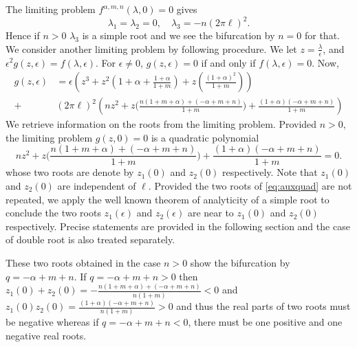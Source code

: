 \documentclass[a4paper,11pt]{article}
\def\l{(2\pi \ell)}
\theoremstyle{remark}
\begin{document}
The limiting problem $f^{\alpha,m,n}(\lambda,0)=0$ gives
$$ \lambda_1=\lambda_2=0, \quad \lambda_3 = -n\l^2.$$
Hence if $n>0$ $\lambda_3$ is a simple root and we see the bifurcation by $n=0$ for that. We consider another limiting problem by following procedure.
We let $z = \frac{\lambda}{\epsilon}$, and $\epsilon^2 g(z,\epsilon) =  f(\lambda, \epsilon)$. For $\epsilon\ne0$, $g(z,\epsilon)=0$ if and only if $f(\lambda,\epsilon)=0$. Now,
\begin{align}
 g(z,\epsilon) &= \epsilon\left( z^3 + z^2\left(1+\alpha + \frac{1+\alpha}{1+m}\right) + z\left(\frac{(1+\alpha)^2}{1+m}\right)\right) \nonumber\\
 +& \l^2\left(nz^2 + z\Big( \frac{n(1+m+\alpha) + (-\alpha+m+n)}{1+m}\Big) + \frac{(1+\alpha)(-\alpha+m+n)}{1+m}  \right) \label{eq:reduced_poly}
\end{align}
We retrieve information on the roots from the limiting problem. Provided $n>0$, the limiting problem $g(z,0)=0$ is a quadratic polynomial
\begin{equation}
nz^2 + z\Big( \frac{n(1+m+\alpha) + (-\alpha+m+n)}{1+m}\Big) + \frac{(1+\alpha)(-\alpha+m+n)}{1+m} =0. \label{eq:auxquad}
\end{equation}
whose two roots are  denote by $z_1(0)$ and $z_2(0)$ respectively.
Note that $z_1(0)$ and $z_2(0)$ are independent of $\ell$. Provided the two roots of \eqref{eq:auxquad} are not repeated, we apply the well known theorem of analyticity of a simple root to conclude the two roots $z_1(\epsilon)$ and $z_2(\epsilon)$ are near to $z_1(0)$ and $z_2(0)$ respectively. Precise statements are provided in the following section and the case of double root is also treated separately.

These two roots obtained in the case $n>0$ show the bifurcation by $q=-\alpha+m+n$. If $q=-\alpha+m+n>0$ then $z_1(0)+z_2(0) = -\frac{n(1+m+\alpha) + (-\alpha+m+n)}{n(1+m)} < 0$ and $z_1(0)z_2(0)=\frac{(1+\alpha)(-\alpha+m+n)}{n(1+m)}>0$ and thus the real parts of two roots must be negative whereas if $q=-\alpha+m+n<0$, there must be one positive and one negative real roots.
\end{document}
